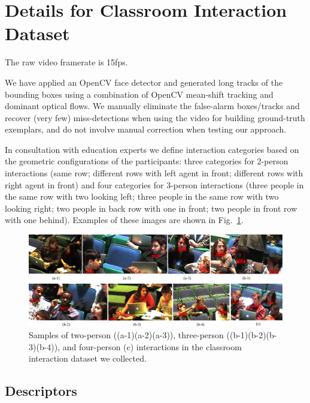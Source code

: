 \documentclass[10pt,twocolumn,letterpaper]{article}
\begin{document}
\section{Details for Classroom Interaction Dataset}

The raw video framerate is 15fps.

We have applied an OpenCV face detector and generated long tracks of the bounding boxes using a combination of OpenCV mean-shift tracking and dominant optical flows. We manually eliminate the false-alarm boxes/tracks and recover (very few) miss-detections when using the video for building ground-truth exemplars, and do not involve manual correction when testing our approach. 


In consultation with education experts we define interaction categories based on the geometric configurations of the participants: three categories for 2-person interactions (same row; different rows with left agent in front; different rows with right agent in front) and four categories for 3-person interactions (three people in the same row with two looking left; three people in the same row with two looking right; two people in back row with one in front; two people in front row with one behind). Examples of these images are shown in Fig.~\ref{dataset}.
\begin{figure}[h]
\begin{center}
\includegraphics[scale=1.2]{dataset.png}
\end{center}
\caption{Samples of two-person ((a-1)(a-2)(a-3)), three-person ((b-1)(b-2)(b-3)(b-4)), and four-person (c) interactions in the classroom interaction dataset we collected.}
\label{dataset}
\end{figure}


\subsection{Descriptors}
\end{document}
